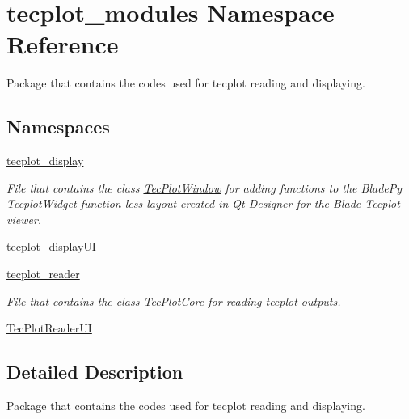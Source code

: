 \hypertarget{namespacetecplot__modules}{}\section{tecplot\+\_\+modules Namespace Reference}
\label{namespacetecplot__modules}


Package that contains the codes used for tecplot reading and displaying.  


\subsection*{Namespaces}
\begin{DoxyCompactItemize}
\item 
 \hyperlink{namespacetecplot__modules_1_1tecplot__display}{tecplot\+\_\+display}
\begin{DoxyCompactList}\small\item\em File that contains the class \hyperlink{classtecplot__modules_1_1tecplot__display_1_1_tec_plot_window}{Tec\+Plot\+Window} for adding functions to the Blade\+Py Tecplot\+Widget function-\/less layout created in Qt Designer for the Blade Tecplot viewer. \end{DoxyCompactList}\item 
 \hyperlink{namespacetecplot__modules_1_1tecplot__display_u_i}{tecplot\+\_\+display\+UI}
\item 
 \hyperlink{namespacetecplot__modules_1_1tecplot__reader}{tecplot\+\_\+reader}
\begin{DoxyCompactList}\small\item\em File that contains the class \hyperlink{classtecplot__modules_1_1tecplot__reader_1_1_tec_plot_core}{Tec\+Plot\+Core} for reading tecplot outputs. \end{DoxyCompactList}\item 
 \hyperlink{namespacetecplot__modules_1_1_tec_plot_reader_u_i}{Tec\+Plot\+Reader\+UI}
\end{DoxyCompactItemize}


\subsection{Detailed Description}
Package that contains the codes used for tecplot reading and displaying. 

